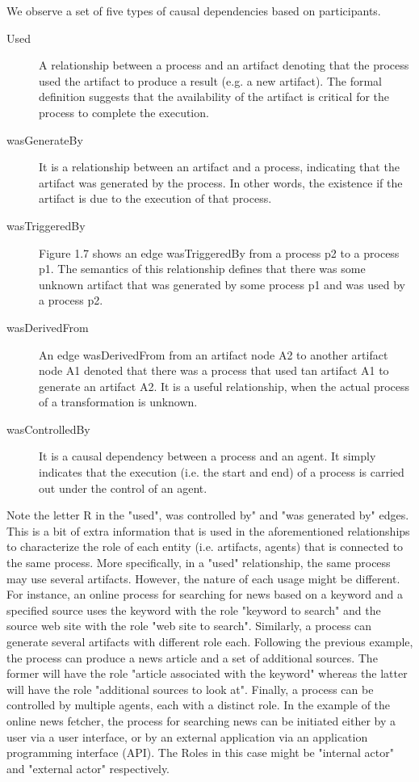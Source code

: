 We observe a set of five types of causal dependencies based on participants.

\begin{description}
  \item[Used] 
        A relationship between a process and an artifact denoting that the process used the artifact to produce a result (e.g. a new artifact). The formal definition suggests that the availability of the artifact is critical for the process to complete the execution.
  \item[wasGenerateBy] 
        It is a relationship between an artifact and a process, indicating that the artifact was generated by the process. In other words, the existence if the artifact is due to the execution of that process.
  \item[wasTriggeredBy] 
        Figure 1.7 shows an edge wasTriggeredBy from a process p2 to a process p1. The semantics of this relationship defines that there was some unknown artifact that was generated by some process p1 and was used by a process p2.
  \item[wasDerivedFrom] 
        An edge wasDerivedFrom from an artifact node A2 to another artifact node A1 denoted that there was a process that used tan artifact A1 to generate an artifact A2. It is a useful relationship, when the actual process of a transformation is unknown.
  \item[wasControlledBy] 
        It is a causal dependency between a process and an agent. It simply indicates that the execution (i.e. the start and end) of a process is carried out under the control of an agent.
\end{description}

Note the letter R in the "used", was controlled by" and "was generated by" edges. This is a bit of extra information that is used in the aforementioned relationships to characterize the role of each entity (i.e. artifacts, agents) that is connected to the same process. More specifically, in a "used" relationship, the same process may use several artifacts. However, the nature of each usage might be different. For instance, an online process for searching for news based on a keyword and a specified source uses the keyword with the role "keyword to search" and the source web site with the role "web site to search". Similarly, a process can generate several artifacts with different role each. Following the previous example, the process can produce a news article and a set of additional sources. The former will have the role "article associated with the keyword" whereas the latter will have the role "additional sources to look at". Finally, a process can be controlled by multiple agents, each with a distinct role. In the example of the online news fetcher, the process for searching news can be initiated either by a user via a user interface, or by an external application via an application programming interface (API). The Roles in this case might be "internal actor" and "external actor" respectively.

